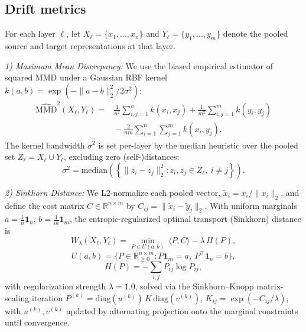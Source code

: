 \documentclass[conference]{IEEEtran}
\begin{document}
\subsection{Drift metrics}
\label{sec:drift-metrics}
For each layer $\ell$, let $X_\ell = \{x_1,\ldots,x_n\}$ and $Y_\ell = \{y_1,\ldots,y_m\}$ denote the pooled source and target representations at that layer.

\textit{1) Maximum Mean Discrepancy:} We use the biased empirical estimator of squared MMD under a Gaussian RBF kernel $k(a,b) = \exp(-\|a-b\|_2^2 / 2\sigma^2)$:
\begin{equation}
\begin{split}
\widehat{\mathrm{MMD}}^2(X_\ell,Y_\ell) = {} & \frac{1}{n^2}\sum_{i,j=1}^{n} k(x_i,x_j) + \frac{1}{m^2}\sum_{i,j=1}^{m} k(y_i,y_j) \\
& {}- \frac{2}{nm}\sum_{i=1}^{n}\sum_{j=1}^{m} k(x_i,y_j).
\end{split}
\end{equation}
The kernel bandwidth $\sigma^2$ is set per-layer by the median heuristic over the pooled set $Z_\ell = X_\ell \cup Y_\ell$, excluding zero (self-)distances:
\begin{equation}
\sigma^2 = \mathrm{median}\left(\left\{\|z_i - z_j\|_2^2 : z_i, z_j \in Z_\ell,\ i \neq j\right\}\right).
\end{equation}

\textit{2) Sinkhorn Distance:} We L2-normalize each pooled vector, $\tilde x_i = x_i / \|x_i\|_2$, and define the cost matrix $C \in \mathbb{R}^{n\times m}$ by $C_{ij} = \|\tilde x_i - \tilde y_j\|_2$. With uniform marginals $a = \tfrac{1}{n}\mathbf{1}_n$, $b = \tfrac{1}{m}\mathbf{1}_m$, the entropic-regularized optimal transport (Sinkhorn) distance is
\begin{equation}
W_\lambda(X_\ell,Y_\ell) = \min_{P \in U(a,b)} \ \langle P, C \rangle - \lambda\, H(P),
\end{equation}
\begin{equation}
U(a,b) = \{P \in \mathbb{R}_{\geq 0}^{n \times m} : P\mathbf{1}_m = a,\ P^\top \mathbf{1}_n = b\},
\end{equation}
\begin{equation}
H(P) = -\sum_{i,j} P_{ij}\log P_{ij},
\end{equation}
with regularization strength $\lambda = 1.0$, solved via the Sinkhorn--Knopp matrix-scaling iteration $P^{(k)} = \mathrm{diag}(u^{(k)})\, K \,\mathrm{diag}(v^{(k)})$, $K_{ij} = \exp(-C_{ij}/\lambda)$, with $u^{(k)}, v^{(k)}$ updated by alternating projection onto the marginal constraints until convergence.
\end{document}
